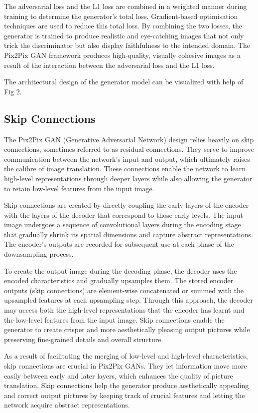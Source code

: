 \documentclass{36_styles/svproc}
\begin{document}
The adversarial loss and the L1 loss are combined in a weighted manner during training to determine the generator's total loss. Gradient-based optimisation techniques are used to reduce this total loss. By combining the two losses, the generator is trained to produce realistic and eye-catching images that not only trick the discriminator but also display faithfulness to the intended domain. The Pix2Pix GAN framework produces high-quality, visually cohesive images as a result of the interaction between the adversarial loss and the L1 loss.

The architectural design of the generator model can be visualized with help of Fig 2.

\subsection{Skip Connections}

The Pix2Pix GAN (Generative Adversarial Network) design relies heavily on skip connections, sometimes referred to as residual connections. They serve to improve communication between the network's input and output, which ultimately raises the calibre of image translation. These connections enable the network to learn high-level representations through deeper layers while also allowing the generator to retain low-level features from the input image.

Skip connections are created by directly coupling the early layers of the encoder with the layers of the decoder that correspond to those early levels. The input image undergoes a sequence of convolutional layers during the encoding stage that gradually shrink its spatial dimensions and capture abstract representations. The encoder's outputs are recorded for subsequent use at each phase of the downsampling process.

To create the output image during the decoding phase, the decoder uses the encoded characteristics and gradually upsamples them. The stored encoder outputs (skip connections) are element-wise concatenated or summed with the upsampled features at each upsampling step. Through this approach, the decoder may access both the high-level representations that the encoder has learnt and the low-level features from the input image. Skip connections enable the generator to create crisper and more aesthetically pleasing output pictures while preserving fine-grained details and overall structure.

As a result of facilitating the merging of low-level and high-level characteristics, skip connections are crucial in Pix2Pix GANs. They let information move more easily between early and later layers, which enhances the quality of picture translation. Skip connections help the generator produce aesthetically appealing and correct output pictures by keeping track of crucial features and letting the network acquire abstract representations.
\end{document}
